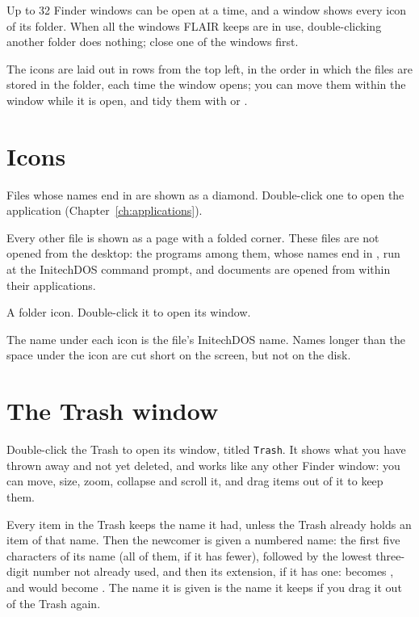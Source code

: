 Up to 32 Finder windows can be open at a time, and a window shows every
icon of its folder.  When all the windows FLAIR keeps are in use,
double-clicking another folder does nothing; close one of the windows first.

  The icons are laid out in rows from the top left, in the order
in which the files are stored in the folder, each time the window opens;
you can move them within the window while it is open, and tidy them with
 or .

\section{Icons}

Files whose names end in  are shown as
a diamond.  Double-click one to open the application (Chapter~\ref{ch:applications}).

Every other file is shown as a page with
a folded corner.  These files are not opened from the desktop: the
programs among them, whose names end in , run at the InitechDOS
command prompt, and documents are opened from within their applications.

A folder icon.  Double-click it to open its window.

The name under each icon is the file's InitechDOS name.  Names longer than
the space under the icon are cut short on the screen, but not on the disk.

\section{The Trash window}
Double-click the Trash to open its window, titled \texttt{Trash}.  It shows
what you have thrown away and not yet deleted, and works like any other
Finder window: you can move, size, zoom, collapse and scroll it, and drag
items out of it to keep them.

Every item in the Trash keeps the name it had, unless the Trash already
holds an item of that name.  Then the newcomer is given a numbered name:
the first five characters of its name (all of them, if it has fewer),
followed by the lowest three-digit number not already used, and then its
extension, if it has one:  becomes , and
 would become .  The name it is given is the name it keeps if you
drag it out of the Trash again.

